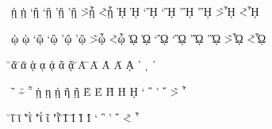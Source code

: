 \documentclass[a4paper]{article}
\begin{document}
{\>\texteta\ypogegrammeni     ᾐ
\<\texteta\ypogegrammeni     ᾑ
\>`\texteta\ypogegrammeni    ᾒ
\<`\texteta\ypogegrammeni    ᾓ
\>'\texteta\ypogegrammeni    ᾔ
\<'\texteta\ypogegrammeni    ᾕ
\~>\texteta\ypogegrammeni    ᾖ
\~<\texteta\ypogegrammeni    ᾗ
\>\textEta\ypogegrammeni     ᾘ
\<\textEta\ypogegrammeni     ᾙ
\>`\textEta\ypogegrammeni    ᾚ
\<`\textEta\ypogegrammeni    ᾛ
\>'\textEta\ypogegrammeni    ᾜ
\<'\textEta\ypogegrammeni    ᾝ
\~>\textEta\ypogegrammeni    ᾞ
\~<\textEta\ypogegrammeni    ᾟ

\>\textomega\ypogegrammeni   ᾠ
\<\textomega\ypogegrammeni   ᾡ
\>`\textomega\ypogegrammeni  ᾢ
\<`\textomega\ypogegrammeni  ᾣ
\>'\textomega\ypogegrammeni  ᾤ
\<'\textomega\ypogegrammeni  ᾥ
\~>\textomega\ypogegrammeni  ᾦ
\~<\textomega\ypogegrammeni  ᾧ
\>\textOmega\ypogegrammeni   ᾨ
\<\textOmega\ypogegrammeni   ᾩ
\>`\textOmega\ypogegrammeni  ᾪ
\<`\textOmega\ypogegrammeni  ᾫ
\>'\textOmega\ypogegrammeni  ᾬ
\<'\textOmega\ypogegrammeni  ᾭ
\~>\textOmega\ypogegrammeni  ᾮ
\~<\textOmega\ypogegrammeni  ᾯ

\u\textalpha                      ᾰ
\=\textalpha                      ᾱ
\accvaria\textalpha\ypogegrammeni ᾲ
\textalpha\ypogegrammeni          ᾳ
\accoxia\textalpha\ypogegrammeni  ᾴ
\accperispomeni\textalpha         ᾶ
\accperispomeni\textalpha\ypogegrammeni ᾷ
\u\textAlpha                      Ᾰ
\=\textAlpha                      Ᾱ
\accvaria\textAlpha               Ὰ
\accoxia\textAlpha                Ά
\textAlpha\ypogegrammeni          ᾼ
\>{ }                             ᾽
{ }\prosgegrammeni                ι
\>{ }                             ᾿

\accperispomeni{ }                ῀
\"\~{ }                           ῁
\accvaria\texteta\ypogegrammeni   ῂ
\texteta\ypogegrammeni            ῃ
\accoxia\texteta\ypogegrammeni    ῄ
\accperispomeni\texteta           ῆ
\accperispomeni\texteta\ypogegrammeni ῇ
\accvaria\textEpsilon             Ὲ
\accoxia\textEpsilon              Έ
\accvaria\textEta                 Ὴ
\accoxia\textEta                  Ή
\textEta\ypogegrammeni            ῌ
\>`{ }                            ῍
\>'{ }                            ῎
\~>{ }                            ῏

\u\textiota                       ῐ
\=\textiota                       ῑ
\`"\textiota                      ῒ
\'"\textiota                      ΐ
\accperispomeni\textiota          ῖ
\accperispomeni"\textiota         ῗ
\u\textIota                       Ῐ
\=\textIota                       Ῑ
\accvaria\textIota                Ὶ
\accoxia\textIota                 Ί
  \<`{ }                          ῝
\>'{ }                            ῞
\~<{ }                            ῟

}
\end{document}
